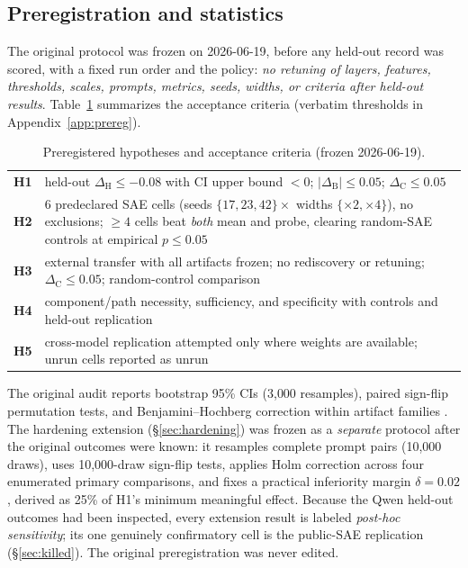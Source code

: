 \documentclass[11pt]{article}
\newcommand{\dH}{\ensuremath{\Delta_{\mathrm{H}}}}
\newcommand{\dB}{\ensuremath{\Delta_{\mathrm{B}}}}
\newcommand{\dC}{\ensuremath{\Delta_{\mathrm{C}}}}
\begin{document}
\subsection{Preregistration and statistics}
\label{sec:prereg}

The original protocol was frozen on 2026-06-19, before any held-out record was
scored, with a fixed run order and the policy: \emph{no retuning of layers,
features, thresholds, scales, prompts, metrics, seeds, widths, or criteria
after held-out results}.  Table~\ref{tab:prereg} summarizes the acceptance
criteria (verbatim thresholds in Appendix~\ref{app:prereg}).

\begin{table}[t]
\centering
\small
\begin{tabular}{@{}p{}p{}@{}}
\toprule
\textbf{H1} & held-out $\dH\le-0.08$ with CI upper bound $<0$;
              $|\dB|\le0.05$; $\dC\le0.05$ \\
\textbf{H2} & 6 predeclared SAE cells (seeds $\{17,23,42\}\times$ widths
              $\{\times2,\times4\}$), no exclusions; $\ge4$ cells beat
              \emph{both} mean and probe, clearing random-SAE controls at
              empirical $p\le0.05$ \\
\textbf{H3} & external transfer with all artifacts frozen; no rediscovery or
              retuning; $\dC\le0.05$; random-control comparison \\
\textbf{H4} & component/path necessity, sufficiency, and specificity with
              controls and held-out replication \\
\textbf{H5} & cross-model replication attempted only where weights are
              available; unrun cells reported as unrun \\
\bottomrule
\end{tabular}
\caption{Preregistered hypotheses and acceptance criteria (frozen 2026-06-19).}
\label{tab:prereg}
\end{table}

The original audit reports bootstrap 95\% CIs (3{,}000 resamples), paired
sign-flip permutation tests, and Benjamini--Hochberg correction within
artifact families \citep{benjamini1995controlling}.  The hardening extension
(\S\ref{sec:hardening}) was frozen as a \emph{separate} protocol after the
original outcomes were known: it resamples complete prompt pairs (10{,}000
draws), uses 10{,}000-draw sign-flip tests, applies Holm correction
\citep{holm1979simple} across four enumerated primary comparisons, and fixes a
practical inferiority margin $\delta=0.02$, derived as 25\% of H1's minimum
meaningful effect.  Because the Qwen held-out outcomes had been inspected,
every extension result is labeled \emph{post-hoc sensitivity}; its one
genuinely confirmatory cell is the public-SAE replication
(\S\ref{sec:killed}).  The original preregistration was never edited.
\end{document}
